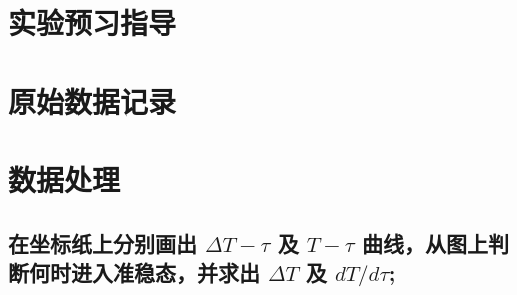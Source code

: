 \documentclass[signature=data]{physicsreport}
\begin{document}
\maketitle

\section{实验预习指导}
\newpage

\section{原始数据记录}
\makeatletter
{}
\makeatother

\newpage

\section{数据处理}
\subsection{在坐标纸上分别画出 $\Delta T-\tau $ 及 $T-\tau$ 曲线，从图上判断何时进入准稳态，并求出 $\Delta T$ 及 $dT/d\tau$;}
\end{document}
